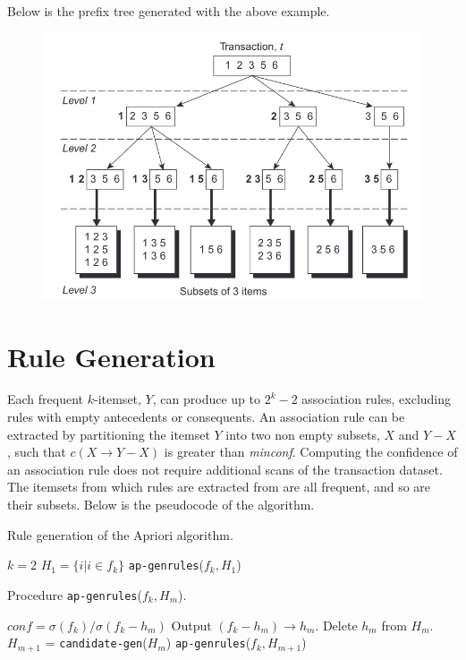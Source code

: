 Below is the prefix tree generated with the above example.

\begin{figure}[h]
    \centering
    \includegraphics[width=0.7\linewidth]{img/apriori_prefixtree.png}   
\end{figure}

\section{Rule Generation}

Each frequent $k$-itemset, $Y$, can produce up to $2^k - 2$ association rules, excluding rules with empty antecedents or consequents. An association rule can be extracted by partitioning the itemset $Y$ into two non empty subsets, $X$ and $Y-X$, such that $c(X \rightarrow Y-X)$ is greater than \textit{minconf}. Computing the confidence of an association rule does not require additional scans of the transaction dataset. The itemsets from which rules are extracted from are all frequent, and so are their subsets. Below is the pseudocode of the algorithm.

\begin{algorithm}[ht]
\caption{Rule generation of the Apriori algorithm.}
\begin{algorithmic}[1]
    \State $k = 2$
        \State $H_1 = \{ i | i \in f_k \}$
        \State \texttt{ap-genrules}($f_k, H_1$)
    \EndFor
\end{algorithmic}
\end{algorithm}

\begin{algorithm}[ht]
\caption{Procedure \texttt{ap-genrules}($f_k, H_m$).}
\begin{algorithmic}[1]
        $conf = \sigma(f_k) / \sigma(f_k - h_m)$
            \State Output $(f_k - h_m) \rightarrow h_m$.
        \Else{}
            \State Delete $h_m$ from $H_m$.
        \EndIf
    \EndFor
        \State $H_{m+1}$ = \texttt{candidate-gen}($H_m$)
        \State \texttt{ap-genrules}($f_k, H_{m+1}$)
    \EndIf
\end{algorithmic}
\end{algorithm}


